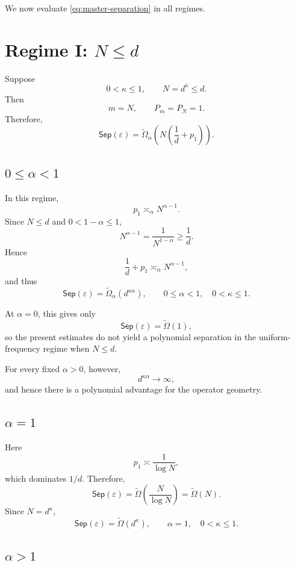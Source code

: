 \documentclass[11pt]{article}
\newcommand{\Sep}{\mathsf{Sep}}
\newcommand{\eps}{\varepsilon}
\begin{document}
We now evaluate \eqref{eq:master-separation} in all regimes.

\section{Regime I: \texorpdfstring{$N\le d$}{N less than d}}

Suppose
\[
0<\kappa\le1, \qquad N=d^\kappa\le d.
\]
Then
\[
m=N, \qquad P_m=P_N=1.
\]
Therefore,
\[
\Sep(\eps) = \widetilde\Omega_\alpha\left( N\left(\frac1d+p_1\right) \right).
\]

\subsection{\texorpdfstring{$0\le\alpha<1$}{alpha less than one}}

In this regime,
\[
p_1\asymp_\alpha N^{\alpha-1}.
\]
Since $N\le d$ and $0<1-\alpha\le1$,
\[
N^{\alpha-1} = \frac1{N^{1-\alpha}} \ge \frac1d.
\]
Hence
\[
\frac1d+p_1 \asymp_\alpha N^{\alpha-1},
\]
and thus
\begin{equation}
\boxed{
\Sep(\eps) = \widetilde\Omega_\alpha(d^{\kappa\alpha}),
\qquad
0\le\alpha<1,\quad 0<\kappa\le1.
}
\label{eq:sep-smallN-alpha-less1}
\end{equation}

At $\alpha=0$, this gives only
\[
\Sep(\eps)=\widetilde\Omega(1),
\]
so the present estimates do not yield a polynomial separation in the
uniform-frequency regime when $N\le d$.

For every fixed $\alpha>0$, however,
\[
d^{\kappa\alpha}\to\infty,
\]
and hence there is a polynomial advantage for the operator geometry.

\subsection{\texorpdfstring{$\alpha=1$}{alpha equals one}}

Here
\[
p_1\asymp\frac1{\log N},
\]
which dominates $1/d$. Therefore,
\[
\Sep(\eps) = \widetilde\Omega\left( \frac{N}{\log N} \right) = \widetilde\Omega(N).
\]
Since $N=d^\kappa$,
\begin{equation}
\boxed{
\Sep(\eps) = \widetilde\Omega(d^\kappa),
\qquad
\alpha=1,\quad 0<\kappa\le1.
}
\label{eq:sep-smallN-alpha1}
\end{equation}

\subsection{\texorpdfstring{$\alpha>1$}{alpha greater than one}}
\end{document}
